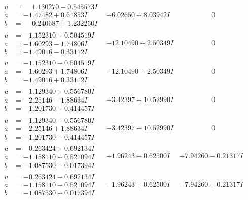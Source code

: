 \documentclass[1p]{elsarticle_modified}
\theoremstyle{definition}
\begin{document}
$$\begin{array}{c|c|c}
 \hline 
\begin{aligned}
u &= \phantom{-}1.130270 - 0.545573 I \\
a &= -1.47482 + 0.61853 I \\
b &= \phantom{-}0.240687 + 1.232260 I\end{aligned}
 & -6.02650 + 8.03942 I & \phantom{-0.000000 } 0 \\ \hline\begin{aligned}
u &= -1.152310 + 0.504519 I \\
a &= -1.60293 - 1.74806 I \\
b &= -1.49016 - 0.33112 I\end{aligned}
 & -12.10490 + 2.50349 I & \phantom{-0.000000 } 0 \\ \hline\begin{aligned}
u &= -1.152310 - 0.504519 I \\
a &= -1.60293 + 1.74806 I \\
b &= -1.49016 + 0.33112 I\end{aligned}
 & -12.10490 - 2.50349 I & \phantom{-0.000000 } 0 \\ \hline\begin{aligned}
u &= -1.129340 + 0.556780 I \\
a &= -2.25146 - 1.88634 I \\
b &= -1.201730 + 0.414457 I\end{aligned}
 & -3.42397 + 10.52990 I & \phantom{-0.000000 } 0 \\ \hline\begin{aligned}
u &= -1.129340 - 0.556780 I \\
a &= -2.25146 + 1.88634 I \\
b &= -1.201730 - 0.414457 I\end{aligned}
 & -3.42397 - 10.52990 I & \phantom{-0.000000 } 0 \\ \hline\begin{aligned}
u &= -0.263424 + 0.692134 I \\
a &= -1.158110 + 0.521094 I \\
b &= -1.087530 - 0.017394 I\end{aligned}
 & -1.96243 - 0.62500 I & -7.94260 - 0.21317 I \\ \hline\begin{aligned}
u &= -0.263424 - 0.692134 I \\
a &= -1.158110 - 0.521094 I \\
b &= -1.087530 + 0.017394 I\end{aligned}
 & -1.96243 + 0.62500 I & -7.94260 + 0.21317 I \\ \hline\begin{aligned}

\end{aligned}
\end{array}$$
\end{document}

